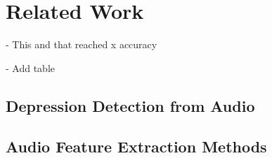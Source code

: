 \section{Related Work}
- This and that reached x accuracy 

- Add table
\subsection{Depression Detection from Audio}
\subsection{Audio Feature Extraction Methods}
